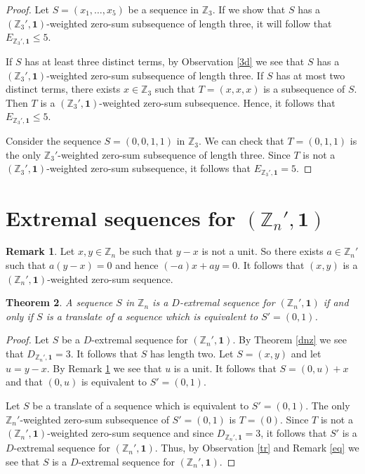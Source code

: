 \documentclass{article}[11pt]
\newtheorem{theorem}{Theorem}[section]
\theoremstyle{definition}
\newtheorem{remark}[theorem]{Remark}
\begin{document}
\begin{proof}
Let $S=(x_1,\ldots,x_5)$ be a sequence in $\mathbb Z_3$. If we show that $S$ has a $(\mathbb Z_3',\mathbf 1)$-weighted zero-sum subsequence of length three, it will follow that $E_{\mathbb Z_3',\mathbf 1}\leq 5$.

If $S$ has at least three distinct terms, by Observation \ref{3d} we see that $S$ has a $(\mathbb Z_3',\mathbf 1)$-weighted zero-sum subsequence of length three. If $S$ has at most two distinct terms, there exists $x\in\mathbb Z_3$ such that $T=(x,x,x)$ is a subsequence of $S$. Then $T$ is a $(\mathbb Z_3',\mathbf 1)$-weighted zero-sum subsequence. Hence, it follows that $E_{\mathbb Z_3',\mathbf 1}\leq 5$.

Consider the sequence $S=(0,0,1,1)$ in $\mathbb Z_3$. We can check that $T=(0,1,1)$ is the only $\mathbb Z_3'$-weighted zero-sum subsequence of length three. Since $T$ is not a $(\mathbb Z_3',\mathbf 1)$-weighted zero-sum subsequence, it follows that $E_{\mathbb Z_3',\mathbf 1}=5$.
\end{proof}







\section{Extremal sequences for $(\mathbb Z_n',\mathbf 1)$}

\begin{remark}\label{zn2}
Let $x,y \in \mathbb Z_n$ be such that $y-x$ is not a unit. So there exists $a\in \mathbb Z_n'$ such that $a(y-x)=0$ and hence $(-a)x+ay=0$. It follows that $(x,y)$ is a $(\mathbb Z_n',\mathbf 1)$-weighted zero-sum sequence.
\end{remark}


\begin{theorem}\label{ednz}
A sequence $S$ in $\mathbb Z_n$ is a $D$-extremal sequence for $(\mathbb Z_n',\mathbf 1)$ if and only if $S$ is a translate of a sequence which is equivalent to $S'=(0,1)$.
\end{theorem}

\begin{proof}
Let $S$ be a $D$-extremal sequence for $(\mathbb Z_n',\mathbf 1)$. By Theorem \ref{dnz} we see that $D_{\mathbb Z_n',\mathbf 1}=3$. It follows that $S$ has length two. Let $S=(x,y)$ and let $u=y-x$. By Remark \ref{zn2} we see that $u$ is a unit. It follows that $S=(0,u)+x$ and that $(0,u)$ is equivalent to $S'=(0,1)$.

Let $S$ be a translate of a sequence which is equivalent to $S'=(0,1)$. The only $\mathbb Z_n'$-weighted zero-sum subsequence of $S'=(0,1)$ is $T=(0)$. Since $T$ is not a $(\mathbb Z_n',\mathbf 1)$-weighted zero-sum sequence and since $D_{\mathbb Z_n',\mathbf 1}=3$, it follows that $S'$ is a $D$-extremal sequence for $(\mathbb Z_n',\mathbf 1)$. Thus, by Observation \ref{tr} and Remark \ref{eq} we see that $S$ is a $D$-extremal sequence for $(\mathbb Z_n',\mathbf 1)$.
\end{proof}
\end{document}
